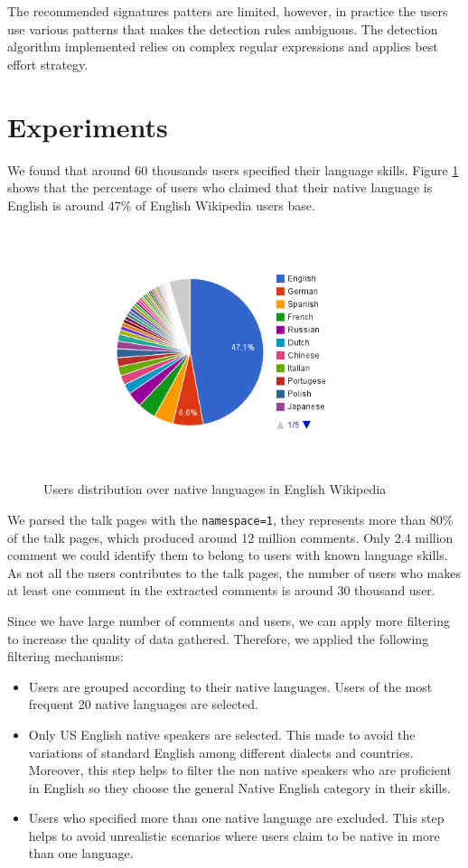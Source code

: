 \documentclass[11pt]{article}
\begin{document}
The recommended signatures patters are limited, however, in practice the users use various patterns that makes the detection rules ambiguous. The detection algorithm implemented relies on complex regular expressions and applies best effort strategy.

\section{Experiments}
We found that around 60 thousands users specified their language skills. Figure \ref{native_dist} shows that the percentage of users who claimed that their native language is English is around 47\% of English Wikipedia users base.

\begin{figure}[htp]
\includegraphics[scale=0.56]{chart_4.png}
\caption{Users distribution over native languages in English Wikipedia}
\label{native_dist}
\end{figure}

We parsed the talk pages with the \verb+namespace=1+, they represents more than 80\% of the talk pages, which produced around 12 million comments. Only 2.4 million comment we could identify them to belong to users with known language skills. As not all the users contributes to the talk pages, the number of users who makes at least one comment in the extracted comments is around 30 thousand user.

Since we have large number of comments and users, we can apply more filtering to increase the quality of data gathered. Therefore, we applied the following filtering mechanisms:
\begin{itemize}
\item Users are grouped according to their native languages. Users of the most frequent 20 native languages are selected.
\item Only US English native speakers are selected. This made to avoid the variations of standard English among different dialects and countries. Moreover, this step helps to filter the non native speakers who are proficient in English so they choose the general Native English category in their skills.
\item Users who specified more than one native language are excluded. This step helps to avoid unrealistic scenarios where users claim to be native in more than one language.
\end{itemize}
\end{document}
